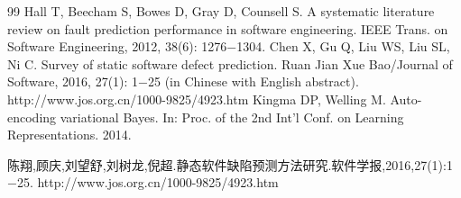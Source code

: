 \documentclass{jos}
\begin{document}
\begin{thebibliography}{99}
 Hall T, Beecham S, Bowes D, Gray D, Counsell S. A systematic literature review on fault
  prediction performance in software engineering. IEEE Trans. on Software Engineering, 2012, 38(6): 1276$-$1304.
 Chen X, Gu Q, Liu WS, Liu SL, Ni C. Survey of static software defect prediction. Ruan Jian
  Xue Bao/Journal of Software, 2016, 27(1): 1$-$25 (in Chinese with English abstract).
  http://www.jos.org.cn/1000-9825/4923.htm
 Kingma DP, Welling M. Auto-encoding variational Bayes. In: Proc. of the 2nd Int'l Conf.
  on Learning Representations. 2014.
\end{thebibliography}

\begin{cnreferences}
 陈翔,顾庆,刘望舒,刘树龙,倪超.静态软件缺陷预测方法研究.软件学报,2016,27(1):1$-$25.
  http://www.jos.org.cn/1000-9825/4923.htm
\end{cnreferences}

\begin{biographies}
\end{biographies}
\end{document}
